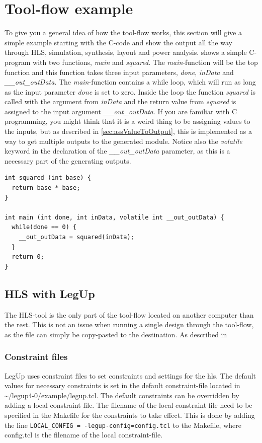 \chapter{Tool-flow example}
To give you a general idea of how the tool-flow works, this section will give a simple example starting with the C-code and show the output all the way through HLS, simulation, synthesis, layout and power analysis.  shows a simple C-program with two functions, \textit{main} and \textit{squared}. The \textit{main}-function will be the top function and this function takes three input parameters, \textit{done}, \textit{inData} and \textit{\_\_out\_outData}. The \textit{main}-function contains a while loop, which will run as long as the input parameter \textit{done} is set to zero. Inside the loop the function \textit{squared} is called with the argument from \textit{inData} and the return value from \textit{squared} is assigned to the input argument \textit{\_\_out\_outData}. If you are familiar with C programming, you might think that it is a weird thing to be assigning values to the inputs, but as described in \cref{sec:assValueToOutput}, this is implemented as a way to get multiple outputs to the generated module. Notice also the \textit{volatile} keyword in the declaration of the \textit{\_\_out\_outData} parameter, as this is a necessary part of the generating outputs.
\lstset{language=C++,style=Cstyle}
\begin{lstlisting}[caption={Simple C-code example},label=lst:ccodelisting]
int squared (int base) {
  return base * base;
}

int main (int done, int inData, volatile int __out_outData) {
  while(done == 0) {
    __out_outData = squared(inData);
  }
  return 0;
}
\end{lstlisting}

\section{HLS with LegUp}
The HLS-tool is the only part of the tool-flow located on another computer than the rest. This is not an issue when running a single design through the tool-flow, as the file can simply be copy-pasted to the destination. As described in \
\subsection{Constraint files}
LegUp uses constraint files to set constraints and settings for the \gls{hls}. The default values for necessary constraints is set in the default constraint-file located in \textasciitilde/legup4-0/example/legup.tcl. The default constraints can be overridden by adding a local constraint file. The filename of the local constraint file need to be specified in the Makefile for the constraints to take effect. This is done by adding the line \verb!LOCAL_CONFIG = -legup-config=config.tcl! to the Makefile, where config.tcl is the filename of the local constraint-file. 
